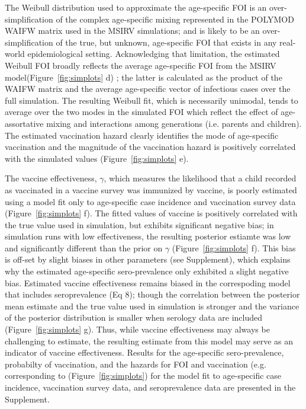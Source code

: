 \documentclass[nofootinbib,aps,pre,twocolumn,superscriptaddress,showkeys,showpacs]{revtex4-1}
\begin{document}
The Weibull distribution used to approximate the age-specific FOI is an over-simplification of the complex age-specific mixing represented in the POLYMOD WAIFW matrix used in the MSIRV simulations; and is likely to be an over-simplification of the true, but unknown, age-specific FOI that exists in any real-world epidemiological setting.  Acknowledging that limitation, the estimated Weibull FOI broadly reflects the average age-specific FOI from the MSIRV model(Figure~\ref{fig:simplots} d) ; the latter is calculated as the product of the WAIFW matrix and the average age-specific vector of infectious cases over the full simulation.  The resulting Weibull fit, which is necessarily unimodal, tends to average over the two modes in the simulated FOI which reflect the effect of age-assortative mixing and interactions among generations (i.e. parents and children).  The estimated vaccination hazard clearly identifies the mode of age-specific vaccination and the magnitude of the vaccination hazard is positively correlated with the simulated values (Figure~\ref{fig:simplots} e). 

The vaccine effectiveness, $\gamma$, which measures the likelihood that a child recorded as vaccinated in a vaccine survey was immunized by vaccine, is poorly estimated using a model fit only to age-specific case incidence and vaccination survey data (Figure~\ref{fig:simplots} f).  The fitted values of vaccine is positively correlated with the true value used in simulation, but exhibits significant negative bias; in simulation runs with low effectiveness, the resulting posterior estiamte was low and significantly different than the prior on $\gamma$ (Figure~\ref{fig:simplots} f).  This bias is off-set by slight biases in other parameters (see Supplement), which explains why the estimated age-specific sero-prevalence only exhibited a slight negative bias. Estimated vaccine effectiveness remains biased in the correspoding model that includes seroprevalence (Eq 8); though the correlation between the posterior mean estimate and the true value used in simulation is stronger and the variance of the posterior distribution is smaller when serology data are included (Figure~\ref{fig:simplots} g).  Thus, while vaccine effectiveness may always be challenging to estimate, the resulting estimate from this model may serve as an indicator of vaccine effectiveness.  Results for the age-specific sero-prevalence, probabilty of vaccination, and the hazards for FOI and vaccination (e.g. corresponding to (Figure~\ref{fig:simplots}) for the model fit to age-specific case incidence, vaccination survey data, and seroprevalence data are presented in the Supplement.
\end{document}
